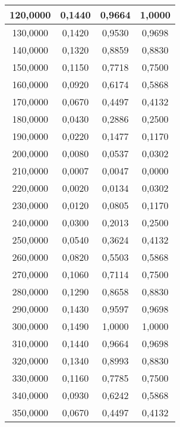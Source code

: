 \documentclass[12pt]{article}
\begin{document}
\begin{enumerate}[wide, labelwidth=!, labelindent=0pt]
\begin{table}[h!]
\begin{tabular}{|c|c|c|c|}
 \hline 
120,0000 & 0,1440 & 0,9664 & 1,0000\\ 
 \hline 
130,0000 & 0,1420 & 0,9530 & 0,9698\\ 
 \hline 
140,0000 & 0,1320 & 0,8859 & 0,8830\\ 
 \hline 
150,0000 & 0,1150 & 0,7718 & 0,7500\\ 
 \hline 
160,0000 & 0,0920 & 0,6174 & 0,5868\\ 
 \hline 
170,0000 & 0,0670 & 0,4497 & 0,4132\\ 
 \hline 
180,0000 & 0,0430 & 0,2886 & 0,2500\\ 
 \hline 
190,0000 & 0,0220 & 0,1477 & 0,1170\\ 
 \hline 
200,0000 & 0,0080 & 0,0537 & 0,0302\\ 
 \hline 
210,0000 & 0,0007 & 0,0047 & 0,0000\\ 
 \hline 
220,0000 & 0,0020 & 0,0134 & 0,0302\\ 
 \hline 
230,0000 & 0,0120 & 0,0805 & 0,1170\\ 
 \hline 
240,0000 & 0,0300 & 0,2013 & 0,2500\\ 
 \hline 
250,0000 & 0,0540 & 0,3624 & 0,4132\\ 
 \hline 
260,0000 & 0,0820 & 0,5503 & 0,5868\\ 
 \hline 
270,0000 & 0,1060 & 0,7114 & 0,7500\\ 
 \hline 
280,0000 & 0,1290 & 0,8658 & 0,8830\\ 
 \hline 
290,0000 & 0,1430 & 0,9597 & 0,9698\\ 
 \hline 
300,0000 & 0,1490 & 1,0000 & 1,0000\\ 
 \hline 
310,0000 & 0,1440 & 0,9664 & 0,9698\\ 
 \hline 
320,0000 & 0,1340 & 0,8993 & 0,8830\\ 
 \hline 
330,0000 & 0,1160 & 0,7785 & 0,7500\\ 
 \hline 
340,0000 & 0,0930 & 0,6242 & 0,5868\\ 
 \hline 
350,0000 & 0,0670 & 0,4497 & 0,4132\\ 
 \hline 


\end{tabular}
\end{table}
\end{enumerate}
\end{document}
